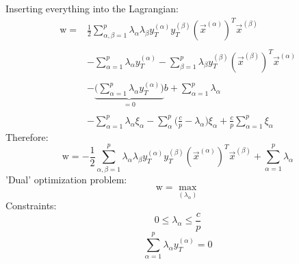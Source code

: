 Inserting everything into the Lagrangian:
\begin{equation}	
	\begin{array}{ll}
	\mathrm{w} = 
	& \frac{1}{2} \sum_{ \alpha, \beta = 1 }^p \lambda_\alpha \lambda_\beta
		y_T^{ (\alpha) } y_T^{ (\beta) } 
		( \vec{x}^{ (\alpha) } )^T 
		\vec{x}^{ (\beta) } \\\\
	& - \sum_{ \alpha = 1 }^p \lambda_\alpha y_T^{ (\alpha) }
	- \sum_{ \beta = 1 }^p \lambda_\beta y_T^{ (\beta) }
	( \vec{x}^{ (\beta) } )^T 
		\vec{x}^{ (\alpha) } \\\\
	& - \underbrace{ \bigg( \sum_{ \alpha = 1 }^p \lambda_\alpha 
		y_T^{ (\alpha) } \bigg) }_{= 0} b 
	+ \sum_{ \alpha = 1 }^p \lambda_\alpha \\\\
	& - \sum_{ \alpha = 1 }^p \lambda_{ \alpha } \xi_{ \alpha }
	- \sum_{ \alpha }^p \Big( \frac{c}{p} - \lambda_{ \alpha } \Big) 
		\xi_{ \alpha }
	+ \frac{c}{p} \sum_{ \alpha = 1 }^p \xi_{ \alpha }
	\end{array}
\end{equation}
Therefore:
\begin{equation}
	\mathrm{w} = -\frac{1}{2} \sum_{ \alpha, \beta = 1 }^p 
		\lambda_\alpha \lambda_\beta y_T^{ (\alpha) }
		y_T^{ (\beta) } ( \vec{x}^{ (\alpha) } )^T
		\vec{x}^{ (\beta) } + \sum_{ \alpha = 1}^p 
		\lambda_\alpha
\end{equation}
'Dual' optimization problem:
\begin{equation}	
	\mathrm{w} = \max_{ (\lambda_\alpha) }
\end{equation}
Constraints:
\begin{equation}
	0 \leq \lambda_\alpha \leq \frac{c}{p}
\end{equation}
\begin{equation}
	\sum_{ \alpha = 1 }^p \lambda_\alpha y_T^{ (\alpha) } = 0
\end{equation}
